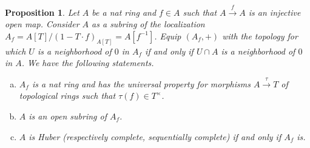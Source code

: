 \documentclass[8pt]{article}
\numberwithin{equation}{section}
\newtheorem{proposition}{Proposition}[subsection]
\begin{document}
\begin{proposition}
    \label{proposition_18_2}
    Let $A$ be a nat ring and $f\in A$ such that $A\stackrel{f}{\to}A$ is an injective open map. Consider $A$ as a subring of the localization $A_f = A[T]/(1-T\cdot f)_{A[T]} = A[f^{-1}]$. Equip $(A_f,+)$ with the topology for which $U$ is a neighborhood of $0$ in $A_f$ if and only if $U\cap A$ is a neighborhood of $0$ in $A$. We have the following statements.
    \begin{enumerate}[a.]
        \item $A_f$ is a nat ring and has the universal property for morphisms $A\stackrel{\tau}{\to}T$ of topological rings such that $\tau(f)\in T^\times$.
        \item $A$ is an open subring of $A_f$.
        \item $A$ is Huber (respectively complete, sequentially complete) if and only if $A_f$ is.
    \end{enumerate}
\end{proposition}
\end{document}
